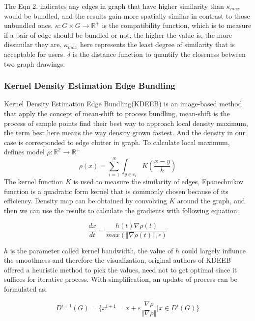 \documentclass{article}
\begin{document}
The Eqn 2. indicates any edges in graph that have higher similarity than $\kappa_{max}$ would be bundled, and the results gain more spatially similar in contrast to those unbundled ones. $\kappa:G\times G \to \mathbb{R}^+$ is the compatibility function, which is to measure if a pair of edge should be bundled or not, the higher the value is, the more dissimilar they are, $\kappa_{max}$ here represents the least degree of similarity that is acceptable for users. $\delta$ is the distance function to quantify the closeness between two graph drawings.

\subsubsection{Kernel Density Estimation Edge Bundling}
Kernel Density Estimation Edge Bundling(KDEEB) is an image-based method that apply the concept of mean-shift\cite{MEANSH} to process bundling, mean-shift is the process of sample points find their best way to approach local density maximum, the term best here means the way density grown fastest. And the density in our case is corresponded to edge clutter in graph. To calculate local maximum, defines model $\rho:\mathbb{R^2}\to \mathbb{R^+}$ 
\begin{equation}
\rho(x) = \sum^{N}_{i=1}\int_{y\in e_i}K(\frac{x-y}{h})
\end{equation}
The kernel function $K$ is used to measure the similarity of edges, Epanechnikov function is a quadratic form kernel that is commonly chosen because of its efficiency. Density map can be obtained by convolving $K$ around the graph, and then we can use the results to calculate the gradients with following equation:

\begin{equation}
\frac{dx}{dt} = \frac{h(t)\nabla\rho(t)}{max(\Vert\nabla\rho(t)\Vert,\epsilon)}
\end{equation}

$h$ is the parameter called kernel bandwidth, the value of $h$ could largely influnce the smoothness and therefore the visualization, original authors of KDEEB offered a heuristic method to pick the values, need not to get optimal since it suffices for iterative process. With simplification, an update of process can be formulated as:

\begin{equation}
D^{i+1}(G) = \{x^{i+1}=x+\varepsilon\frac{\nabla\rho}{\Vert\nabla\rho\Vert}|x\in D^i(G)\}
\end{equation}
\end{document}
